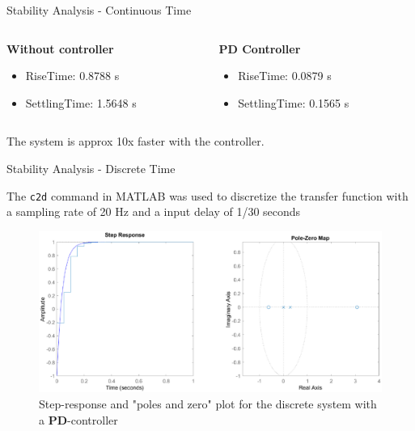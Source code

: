 \documentclass{beamer}
\begin{document}
\begin{frame}{Stability Analysis - Continuous Time}
   \begin{columns}
   \begin{column}[]{0.5\textwidth}
  \textbf{Without controller}
  
  \begin{itemize}
      \item RiseTime: 0.8788 s
      \item SettlingTime: 1.5648 s
  \end{itemize}
   \end{column}
   \begin{column}[]{0.5\textwidth}
   \textbf{PD Controller}
   
    \begin{itemize}
      \item RiseTime: 0.0879 s
      \item SettlingTime: 0.1565 s
  \end{itemize}
   \end{column}
   \end{columns}
   The system is approx 10x faster with the controller.
   \end{frame}

\begin{frame}{Stability Analysis - Discrete Time}

    The \texttt{c2d} command in MATLAB was used to discretize the transfer function with a sampling rate of 20 Hz and a input delay of 1/30 seconds
    
    \begin{figure}
    \centering
    \includegraphics[width=1\textwidth]{PDd_controller_stab.eps}
    \caption{Step-response and "poles and zero" plot for the discrete system with a \textbf{PD}-controller}
\end{figure}

\end{frame}
\end{document}
